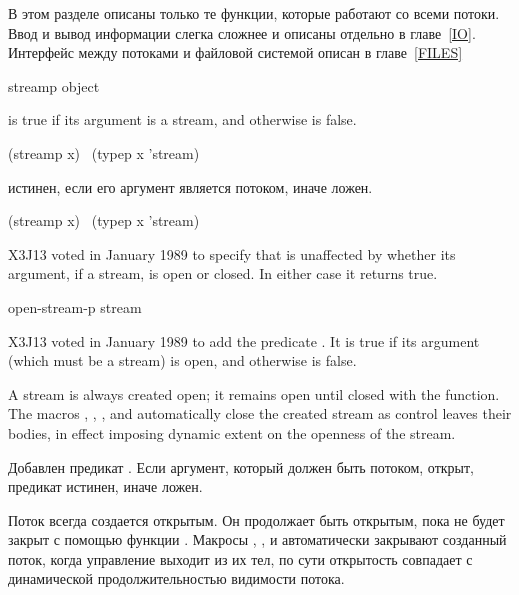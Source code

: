 В этом разделе описаны только те функции, которые работают со всеми
потоки. Ввод и вывод информации слегка сложнее и описаны отдельно в
главе~\ref{IO}.
Интерфейс между потоками и файловой системой описан в главе~\ref{FILES}

\begin{defun}[Function]
streamp object

 is true if its argument is a stream,
and otherwise is false.
\begin{lisp}
(streamp x) \EQ\ (typep x 'stream)
\end{lisp}

 истинен, если его аргумент является потоком, иначе ложен.
\begin{lisp}
(streamp x) \EQ\ (typep x 'stream)
\end{lisp}

\begin{new}
X3J13 voted in January 1989
to specify that  is unaffected
by whether its argument, if a stream, is open or closed.  In either case
it returns true.
\end{new}
\end{defun}

\begin{newer}
\begin{defun}[Function]
open-stream-p stream

X3J13 voted in January 1989 
to add the predicate .
It is true if its argument (which must be a stream)
is open, and otherwise is false.

A stream is always created open; it remains open until closed
with the  function.  The macros ,
, ,
and  automatically close the created stream
as control leaves their bodies, in effect imposing dynamic extent
on the openness of the stream.

Добавлен предикат .
Если аргумент, который должен быть потоком, открыт, предикат истинен, иначе
ложен.

Поток всегда создается открытым. Он продолжает быть открытым, пока не будет
закрыт с помощью функции . Макросы ,
,  и 
автоматически закрывают созданный поток, когда управление выходит из их тел, по
сути открытость совпадает с динамической продолжительностью видимости потока. 
\end{defun}
\end{newer}

